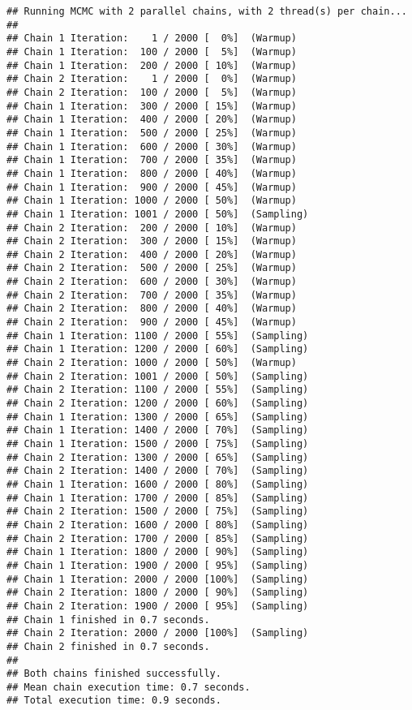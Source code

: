 \documentclass[
]{article}
\begin{document}
\begin{verbatim}
## Running MCMC with 2 parallel chains, with 2 thread(s) per chain...
## 
## Chain 1 Iteration:    1 / 2000 [  0%]  (Warmup) 
## Chain 1 Iteration:  100 / 2000 [  5%]  (Warmup) 
## Chain 1 Iteration:  200 / 2000 [ 10%]  (Warmup) 
## Chain 2 Iteration:    1 / 2000 [  0%]  (Warmup) 
## Chain 2 Iteration:  100 / 2000 [  5%]  (Warmup) 
## Chain 1 Iteration:  300 / 2000 [ 15%]  (Warmup) 
## Chain 1 Iteration:  400 / 2000 [ 20%]  (Warmup) 
## Chain 1 Iteration:  500 / 2000 [ 25%]  (Warmup) 
## Chain 1 Iteration:  600 / 2000 [ 30%]  (Warmup) 
## Chain 1 Iteration:  700 / 2000 [ 35%]  (Warmup) 
## Chain 1 Iteration:  800 / 2000 [ 40%]  (Warmup) 
## Chain 1 Iteration:  900 / 2000 [ 45%]  (Warmup) 
## Chain 1 Iteration: 1000 / 2000 [ 50%]  (Warmup) 
## Chain 1 Iteration: 1001 / 2000 [ 50%]  (Sampling) 
## Chain 2 Iteration:  200 / 2000 [ 10%]  (Warmup) 
## Chain 2 Iteration:  300 / 2000 [ 15%]  (Warmup) 
## Chain 2 Iteration:  400 / 2000 [ 20%]  (Warmup) 
## Chain 2 Iteration:  500 / 2000 [ 25%]  (Warmup) 
## Chain 2 Iteration:  600 / 2000 [ 30%]  (Warmup) 
## Chain 2 Iteration:  700 / 2000 [ 35%]  (Warmup) 
## Chain 2 Iteration:  800 / 2000 [ 40%]  (Warmup) 
## Chain 2 Iteration:  900 / 2000 [ 45%]  (Warmup) 
## Chain 1 Iteration: 1100 / 2000 [ 55%]  (Sampling) 
## Chain 1 Iteration: 1200 / 2000 [ 60%]  (Sampling) 
## Chain 2 Iteration: 1000 / 2000 [ 50%]  (Warmup) 
## Chain 2 Iteration: 1001 / 2000 [ 50%]  (Sampling) 
## Chain 2 Iteration: 1100 / 2000 [ 55%]  (Sampling) 
## Chain 2 Iteration: 1200 / 2000 [ 60%]  (Sampling) 
## Chain 1 Iteration: 1300 / 2000 [ 65%]  (Sampling) 
## Chain 1 Iteration: 1400 / 2000 [ 70%]  (Sampling) 
## Chain 1 Iteration: 1500 / 2000 [ 75%]  (Sampling) 
## Chain 2 Iteration: 1300 / 2000 [ 65%]  (Sampling) 
## Chain 2 Iteration: 1400 / 2000 [ 70%]  (Sampling) 
## Chain 1 Iteration: 1600 / 2000 [ 80%]  (Sampling) 
## Chain 1 Iteration: 1700 / 2000 [ 85%]  (Sampling) 
## Chain 2 Iteration: 1500 / 2000 [ 75%]  (Sampling) 
## Chain 2 Iteration: 1600 / 2000 [ 80%]  (Sampling) 
## Chain 2 Iteration: 1700 / 2000 [ 85%]  (Sampling) 
## Chain 1 Iteration: 1800 / 2000 [ 90%]  (Sampling) 
## Chain 1 Iteration: 1900 / 2000 [ 95%]  (Sampling) 
## Chain 1 Iteration: 2000 / 2000 [100%]  (Sampling) 
## Chain 2 Iteration: 1800 / 2000 [ 90%]  (Sampling) 
## Chain 2 Iteration: 1900 / 2000 [ 95%]  (Sampling) 
## Chain 1 finished in 0.7 seconds.
## Chain 2 Iteration: 2000 / 2000 [100%]  (Sampling) 
## Chain 2 finished in 0.7 seconds.
## 
## Both chains finished successfully.
## Mean chain execution time: 0.7 seconds.
## Total execution time: 0.9 seconds.
\end{verbatim}
\end{document}
